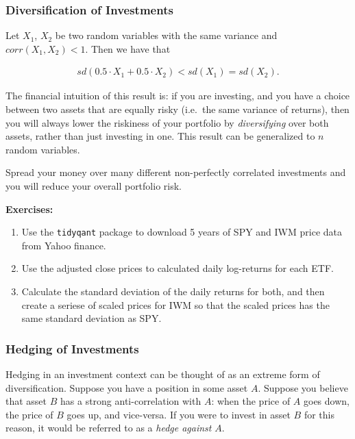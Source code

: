\documentclass[11pt,]{krantz}
\begin{document}
\subsubsection*{Diversification of Investments}\label{diversification-of-investments}

Let \(X_1\), \(X_2\) be two random variables with the same variance and \(corr(X_1, X_2) < 1\). Then we have that

\begin{align*}
sd(0.5 \cdot X_1 + 0.5 \cdot X_2) < sd(X_1) = sd(X_2).
\end{align*}

The financial intuition of this result is: if you are investing, and you have a choice between two assets that are equally risky (i.e.~the same variance of returns), then you will always lower the riskiness of your portfolio by \emph{diversifying} over both assets, rather than just investing in one. This result can be generalized to \(n\) random variables.

Spread your money over many different non-perfectly correlated investments and you will reduce your overall portfolio risk.

\textbf{Exercises:}

\begin{enumerate}
\def\labelenumi{\arabic{enumi}.}
\item
  Use the \texttt{tidyqant} package to download 5 years of SPY and IWM price data from Yahoo finance.
\item
  Use the adjusted close prices to calculated daily log-returns for each ETF.
\item
  Calculate the standard deviation of the daily returns for both, and then create a seriese of scaled prices for IWM so that the scaled prices has the same standard deviation as SPY.
\end{enumerate}

\subsubsection*{Hedging of Investments}\label{hedging-of-investments}

Hedging in an investment context can be thought of as an extreme form of diversification. Suppose you have a position in some asset \(A\). Suppose you believe that asset \(B\) has a strong anti-correlation with \(A\): when the price of \(A\) goes down, the price of \(B\) goes up, and vice-versa. If you were to invest in asset \(B\) for this reason, it would be referred to as a \emph{hedge against} \(A\).
\end{document}
